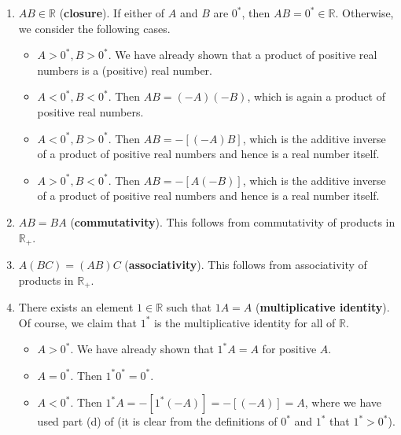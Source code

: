 \documentclass[12pt]{article}
\theoremstyle{definition}
\begin{document}
\begin{enumerate}[label = (M\arabic*)]
    \item \( AB \in \mathbb{R} \) (\textbf{closure}). If either of \( A \) and \( B \) are \( 0^* \), then \( AB = 0^* \in \mathbb{R} \). Otherwise, we consider the following cases.
    
    \begin{itemize}
        \item \( A > 0^*, B > 0^* \). We have already shown that a product of positive real numbers is a (positive) real number.
        
        \item \( A < 0^*, B < 0^* \). Then \( AB = (-A)(-B) \), which is again a product of positive real numbers.
        
        \item \( A < 0^*, B > 0^* \). Then \( AB = -[(-A)B] \), which is the additive inverse of a product of positive real numbers and hence is a real number itself.
        
        \item \( A > 0^*, B < 0^* \). Then \( AB = -[A(-B)] \), which is the additive inverse of a product of positive real numbers and hence is a real number itself.
    \end{itemize}

    \item \( AB = BA \) (\textbf{commutativity}). This follows from commutativity of products in \( \mathbb{R}_+ \).

    \item \( A(BC) = (AB)C \) (\textbf{associativity}). This follows from associativity of products in \( \mathbb{R}_+ \).

    \item There exists an element \( 1 \in \mathbb{R} \) such that \( 1A = A \) (\textbf{multiplicative identity}). Of course, we claim that \( 1^* \) is the multiplicative identity for all of \( \mathbb{R} \).

    \begin{itemize}
        \item \( A > 0^* \). We have already shown that \( 1^* A = A \) for positive \( A \).

        \item \( A = 0^* \). Then \( 1^* 0^* = 0^* \).

        \item \( A < 0^* \). Then \( 1^* A = -[1^* (-A)] = -[(-A)] = A \), where we have used part (d) of  (it is clear from the definitions of \( 0^* \) and \( 1^* \) that \( 1^* > 0^* \)).
    \end{itemize}


\end{enumerate}
\end{document}
